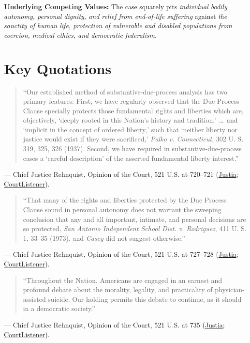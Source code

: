 \documentclass[12pt]{article}
\begin{document}
\textbf{Underlying Competing Values:} The case squarely pits \textit{individual bodily autonomy, personal dignity, and relief from end-of-life suffering} against \textit{the sanctity of human life, protection of vulnerable and disabled populations from coercion, medical ethics, and democratic federalism}.

\section{Key Quotations}

\begin{quote}
``Our established method of substantive-due-process analysis has two primary features: First, we have regularly observed that the Due Process Clause specially protects those fundamental rights and liberties which are, objectively, `deeply rooted in this Nation's history and tradition,' \ldots\ and `implicit in the concept of ordered liberty,' such that `neither liberty nor justice would exist if they were sacrificed,' \textit{Palko v. Connecticut}, 302 U. S. 319, 325, 326 (1937). Second, we have required in substantive-due-process cases a `careful description' of the asserted fundamental liberty interest.''
\end{quote}
\noindent --- Chief Justice Rehnquist, Opinion of the Court, 521 U.S. at 720--721 (\href{https://supreme.justia.com/cases/federal/us/521/702/}{Justia}; \href{https://www.courtlistener.com/opinion/118144/washington-v-glucksberg/}{CourtListener}).

\begin{quote}
``That many of the rights and liberties protected by the Due Process Clause sound in personal autonomy does not warrant the sweeping conclusion that any and all important, intimate, and personal decisions are so protected, \textit{San Antonio Independent School Dist. v. Rodriguez}, 411 U. S. 1, 33--35 (1973), and \textit{Casey} did not suggest otherwise.''
\end{quote}
\noindent --- Chief Justice Rehnquist, Opinion of the Court, 521 U.S. at 727--728 (\href{https://supreme.justia.com/cases/federal/us/521/702/}{Justia}; \href{https://www.courtlistener.com/opinion/118144/washington-v-glucksberg/}{CourtListener}).

\begin{quote}
``Throughout the Nation, Americans are engaged in an earnest and profound debate about the morality, legality, and practicality of physician-assisted suicide. Our holding permits this debate to continue, as it should in a democratic society.''
\end{quote}
\noindent --- Chief Justice Rehnquist, Opinion of the Court, 521 U.S. at 735 (\href{https://supreme.justia.com/cases/federal/us/521/702/}{Justia}; \href{https://www.courtlistener.com/opinion/118144/washington-v-glucksberg/}{CourtListener}).
\end{document}
